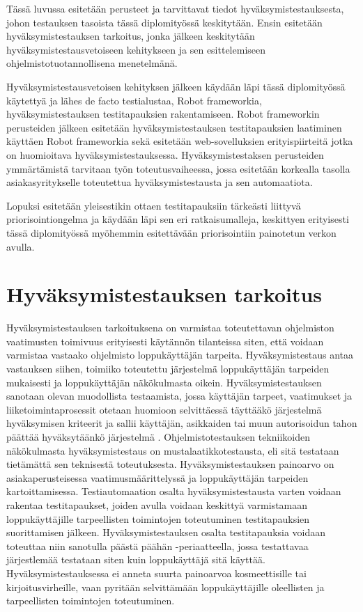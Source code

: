 Tässä luvussa esitetään perusteet ja tarvittavat tiedot hyväksymistestauksesta, johon testauksen tasoista tässä diplomityössä keskitytään.
Ensin esitetään hyväksymistestauksen tarkoitus, jonka jälkeen keskitytään hyväksymistestausvetoiseen kehitykseen ja sen esittelemiseen ohjelmistotuotannollisena menetelmänä.

Hyväksymistestausvetoisen kehityksen jälkeen käydään läpi tässä diplomityössä käytettyä ja lähes de facto testialustaa, Robot frameworkia, hyväksymistestauksen testitapauksien rakentamiseen.
Robot frameworkin perusteiden jälkeen esitetään hyväksymistestauksen testitapauksien laatiminen käyttäen Robot frameworkia sekä esitetään web-sovelluksien erityispiirteitä jotka on huomioitava hyväksymistestauksessa.
Hyväksymistestaksen perusteiden ymmärtämistä tarvitaan työn toteutusvaiheessa, jossa esitetään korkealla tasolla asiakasyritykselle toteutettua hyväksymistestausta ja sen automaatiota.

Lopuksi esitetään yleisestikin ottaen testitapauksiin tärkeästi liittyvä priorisointiongelma ja käydään läpi sen eri ratkaisumalleja, keskittyen erityisesti tässä diplomityössä myöhemmin esitettävään priorisointiin painotetun verkon avulla.

\section{Hyväksymistestauksen tarkoitus} \label{ch:08_hyvaksymistestauksen_tarkoitus}

  Hyväksymistestauksen tarkoituksena on varmistaa toteutettavan ohjelmiston vaatimusten toimivuus erityisesti käytännön tilanteissa siten, että voidaan varmistaa vastaako ohjelmisto loppukäyttäjän tarpeita.
  Hyväksymistestaus antaa vastauksen siihen, toimiiko toteutettu järjestelmä loppukäyttäjän tarpeiden mukaisesti ja loppukäyttäjän näkökulmasta oikein.
  Hyväksymistestauksen sanotaan olevan muodollista testaamista, jossa käyttäjän tarpeet, vaatimukset ja liiketoimintaprosessit otetaan huomioon selvittäessä täyttääkö järjestelmä hyväksymisen kriteerit ja sallii käyttäjän, asikkaiden tai muun autorisoidun tahon päättää hyväksytäänkö järjestelmä \parencite{istqb_glossary_nodate}.
  Ohjelmistotestauksen tekniikoiden näkökulmasta hyväksymistestaus on mustalaatikkotestausta, eli sitä testataan tietämättä sen teknisestä toteutuksesta.
  Hyväksymistestauksen painoarvo on asiakaperusteisessa vaatimusmäärittelyssä ja loppukäyttäjän tarpeiden kartoittamisessa.
  Testiautomaation osalta hyväksymistestausta varten voidaan rakentaa testitapaukset, joiden avulla voidaan keskittyä varmistamaan loppukäyttäjille tarpeellisten toimintojen toteutuminen testitapauksien suorittamisen jälkeen.
  Hyväksymistestauksen osalta testitapauksia voidaan toteuttaa niin sanotulla päästä päähän -periaatteella, jossa testattavaa järjestlemää testataan siten kuin loppukäyttäjä sitä käyttää.
  Hyväksymistestauksessa ei anneta suurta painoarvoa kosmeettisille tai kirjoitusvirheille, vaan pyritään selvittämään loppukäyttäjille oleellisten ja tarpeellisten toimintojen toteutuminen.


